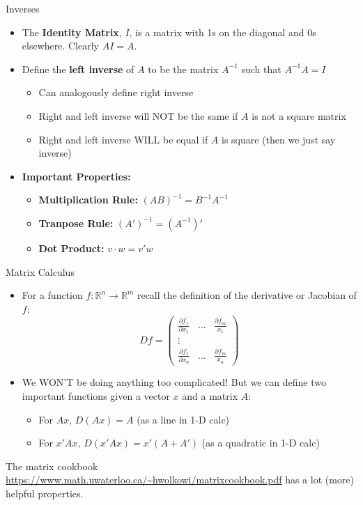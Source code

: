 \documentclass[aspectratio=169,11pt]{beamer}
\begin{document}
\begin{frame}{Inverses}
\begin{itemize}
	\item The {\bf Identity Matrix}, $I$, is a matrix with 1s on the diagonal and 0s elsewhere. Clearly $AI = A$.	
	\item Define the {\bf left inverse} of $A$ to be the matrix $A^{-1}$ such that $A^{-1}A=I$
	\begin{itemize}
		\item Can analogously define right inverse
		\item Right and left inverse will NOT be the same if $A$ is not a square matrix
		\item Right and left inverse WILL be equal if $A$ is square (then we just say inverse)
	\end{itemize}
	\item {\bf Important Properties:}
		\begin{itemize}
			\item {\bf Multiplication Rule:} $(AB)^{-1} = B^{-1}A^{-1}$
			\item {\bf Tranpose Rule:} $(A')^{-1} = (A^{-1})'$
			\item {\bf Dot Product:} $v\cdot w = v'w$
		\end{itemize}
\end{itemize}

\end{frame}

\begin{frame}{Matrix Calculus}
	\begin{itemize}
		\item For a function $f:\mathbb{R}^n\to\mathbb{R}^m$ recall the definition of the derivative or Jacobian of $f$:
			\[
				Df = \left(\begin{array}{ccc}
					\frac{\partial f_1}{\partial x_1} & \dots & \frac{\partial f_m}{x_1}\\
					\vdots & & \\
					\frac{\partial f_1}{\partial x_n} & \dots & \frac{\partial f_m}{x_n}
					 \end{array}\right)
			\]
		\item We WON'T be doing anything too complicated! But we can define two important functions given a vector $x$ and a matrix $A$:
		\begin{itemize}
			\item For $Ax$, $D(Ax) = A$ (as a line in 1-D calc)
			\item For $x'Ax$, $D(x'Ax) = x'(A+A')$ (as a quadratic in 1-D calc)
		\end{itemize}
	\end{itemize}
	The matrix cookbook \url{https://www.math.uwaterloo.ca/~hwolkowi/matrixcookbook.pdf} has a lot (more) helpful properties.
\end{frame}
\end{document}
